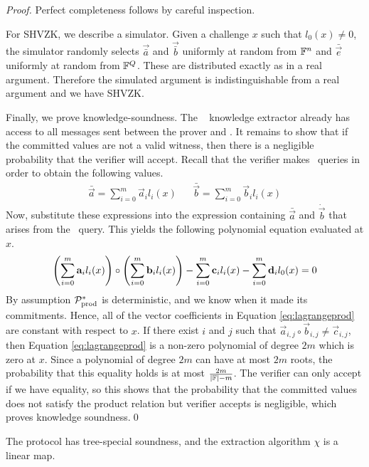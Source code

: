 \begin{proof} Perfect completeness follows by careful inspection.

For SHVZK, we describe a simulator. Given a challenge $x$ such that $l_0(x) \neq 0$, the simulator randomly selects $\vec{\bar{a}}$ and $\vec{\bar{b}}$ uniformly at random from $\mathbb{F}^n$ and $\bar{\vec{e}}$ uniformly at random from $\mathbb{F}^Q$. These are distributed exactly as in a real argument. Therefore the simulated argument is indistinguishable from a real argument and we have SHVZK.

Finally, we prove knowledge-soundness. The \ILC~ knowledge extractor already has access to all messages sent between the prover and \ILC. It remains to show that if the committed values are not a valid witness, then there is a negligible probability that the verifier will accept.
Recall that the verifier makes \ILCopen \ queries in order to obtain the following values.
\begin{align*}
\bar{\vec{a}} = \sum_{i=0}^m \vec{a}_{i} l_i(x) &&
\bar{\vec{b}} = \sum_{i=0}^m \vec{b}_{i} l_i(x)
\end{align*}
Now, substitute these expressions into the expression containing $\bar{\vec{a}}$ and $\dot{\vec{b}}$ that arises from the \ILCcheck\ query. This yields the following polynomial equation evaluated at $x$.
\begin{align}\label{eq:lagrangeprod}
\left( \sum_{i=0}^m \mathbf{a}_i l_i(x) \right) \circ \left( \sum_{i=0}^m \mathbf{b}_i l_i(x) \right) - \sum_{i=0}^m \mathbf{c}_{i} l_i(x) - \sum_{i=0}^m \mathbf{d}_i l_0(x) = 0
\end{align}
By assumption $\mathcal{P}^*_{\textnormal{prod}}$ is deterministic, and we know when it made its commitments. Hence, all of the vector coefficients in Equation \ref{eq:lagrangeprod} are constant with respect to $x$. If there exist $i$ and $j$ such that $\vec{a}_{i,j}\circ \vec{b}_{i,j}\neq \vec{c}_{i,j}$, then Equation \ref{eq:lagrangeprod} is a non-zero polynomial of degree $2m$ which is zero at $x$. Since a polynomial of degree $2m$ can have at most $2m$ roots, the probability that this equality holds is at most $\frac{2m}{|\mathbb{F}| - m}$. The verifier can only accept if we have equality, so this shows that the probability that the committed values does not satisfy the product relation but verifier accepts is negligible, which proves knowledge soundness.\qed
\end{proof}

\begin{lemma}
The protocol has tree-special soundness, and the extraction algorithm $\chi$ is a linear map.
\end{lemma}

